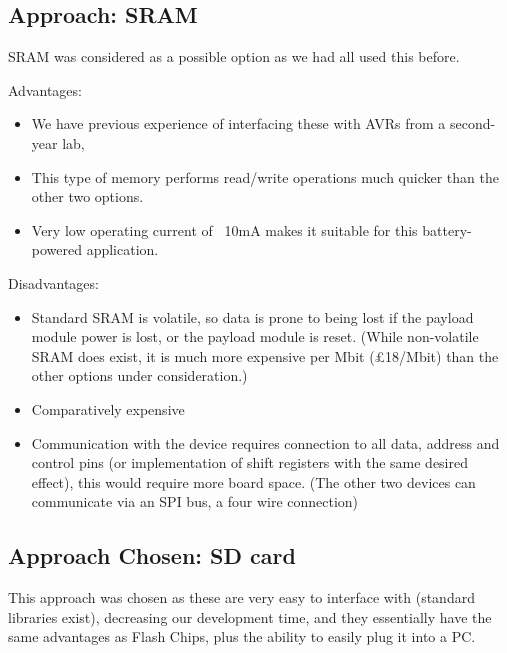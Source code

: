 \subsection{Approach: SRAM}

SRAM was considered as a possible option as we had all used this before.

Advantages:
\begin{itemize}
\item We have previous experience of interfacing these with AVRs from a 
second-year lab, 
\item This type of memory performs read/write operations much quicker than 
the other two options.
\item Very low operating current of ~10mA makes it suitable for this battery-powered application.
\end{itemize}

Disadvantages:
\begin{itemize}
\item Standard SRAM is volatile, so data is prone to being lost if the payload 
module power is lost, or the payload module is reset. (While non-volatile SRAM 
does exist, it is much more expensive per Mbit (\pounds18/Mbit) than the other 
options under consideration.)
\item Comparatively expensive
\item Communication with the device requires connection to all data, address 
and control pins (or implementation of shift registers with the same desired 
effect), this would require more board space. (The other two devices can 
communicate via an SPI bus, a four wire connection)
\end{itemize}

\subsection{Approach Chosen: SD card}

This approach was chosen as these are very easy to interface with (standard libraries exist), decreasing our development time, 
and they essentially have the same advantages as Flash Chips, plus the ability to easily plug it into a PC.